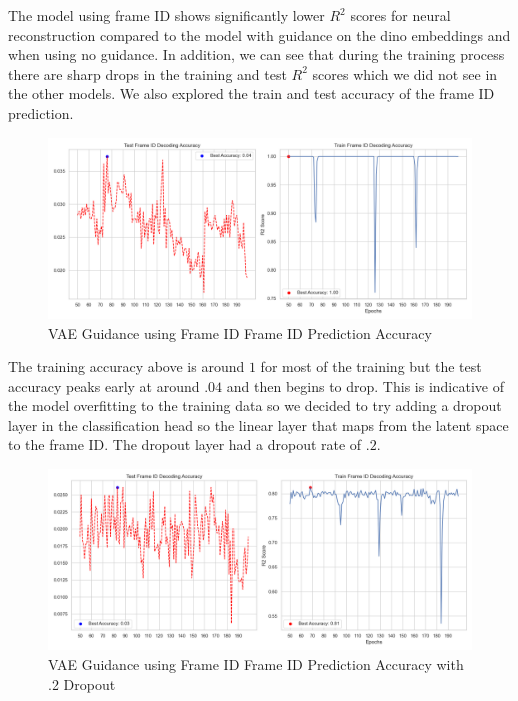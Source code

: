 \documentclass[12pt, letterpaper]{article}
\begin{document}
The model using frame ID shows significantly lower $R^2$ scores for neural reconstruction compared to the model with guidance on the dino embeddings and when using no guidance. In addition, we can see that during the training process there are sharp drops in the training and test $R^2$ scores which we did not see in the other models. We also explored the train and test accuracy of the frame ID prediction.

\begin{figure}[H]
    \centering
    \includegraphics[width=1.0\textwidth]{frame_id_accuracy_128dim_503_top_var_200_epochs_0.05_beta_2_layer.png}
    \caption{VAE Guidance using Frame ID Frame ID Prediction Accuracy}
    \label{fig:vae_guidance_frame_id_accuracy}
\end{figure}

The training accuracy above is around $1$ for most of the training but the test accuracy peaks early at around $.04$ and then begins to drop. This is indicative of the model overfitting to the training data so we decided to try adding a dropout layer in the classification head so the linear layer that maps from the latent space to the frame ID. The dropout layer had a dropout rate of $.2$. 

\begin{figure}[H]
    \centering
    \includegraphics[width=1.0\textwidth]{frame_id_accuracy_128dim_503_top_var_200_epochs_0.05_beta_2_layer_.2_dropout.png}
    \caption{VAE Guidance using Frame ID Frame ID Prediction Accuracy with .2 Dropout}
    \label{fig:vae_guidance_frame_id_accuracy_dropout}
\end{figure}
\end{document}
